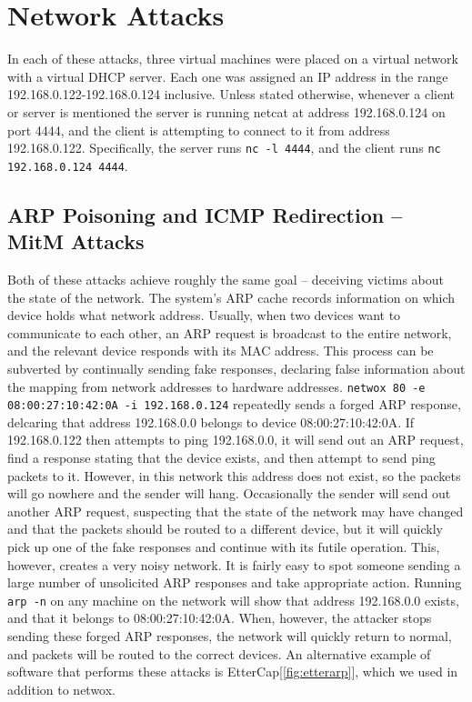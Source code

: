 \section{Network Attacks}


In each of these attacks, three virtual machines were placed on a virtual network with a virtual DHCP server. Each one
was assigned an IP address in the range 192.168.0.122-192.168.0.124 inclusive. Unless stated otherwise, whenever a
client or server is mentioned the server is running netcat at address 192.168.0.124 on port 4444, and the client is
attempting to connect to it from address 192.168.0.122. Specifically, the server runs {\tt nc -l 4444}, and the client
runs {\tt nc 192.168.0.124 4444}.

\subsection{ARP Poisoning and ICMP Redirection -- MitM Attacks}

Both of these attacks achieve roughly the same goal -- deceiving victims about the state of the network. The system's
ARP cache records information on which device holds what network address. Usually, when two devices want to communicate
to each other, an ARP request is broadcast to the entire network, and the relevant device responds with its MAC address.
This process can be subverted by continually sending fake responses, declaring false information about the mapping from
network addresses to hardware addresses. {\tt netwox 80 -e 08:00:27:10:42:0A -i 192.168.0.124} repeatedly sends a forged
ARP response, delcaring that address 192.168.0.0 belongs to device 08:00:27:10:42:0A. If 192.168.0.122 then attempts to
ping 192.168.0.0, it will send out an ARP request, find a response stating that the device exists, and then attempt to
send ping packets to it. However, in this network this address does not exist, so the packets will go nowhere and the
sender will hang. Occasionally the sender will send out another ARP request, suspecting that the state of the network
may have changed and that the packets should be routed to a different device, but it will quickly pick up one of the
fake responses and continue with its futile operation. This, however, creates a very noisy network. It is fairly easy to
spot someone sending a large number of unsolicited ARP responses and take appropriate action. Running {\tt arp -n} on
any machine on the network will show that address 192.168.0.0 exists, and that it belongs to 08:00:27:10:42:0A. When,
however, the attacker stops sending these forged ARP responses, the network will quickly return to normal, and packets
will be routed to the correct devices. An alternative example of software that performs these attacks is
EtterCap[\ref{fig:etterarp}], which we used in addition to netwox.

